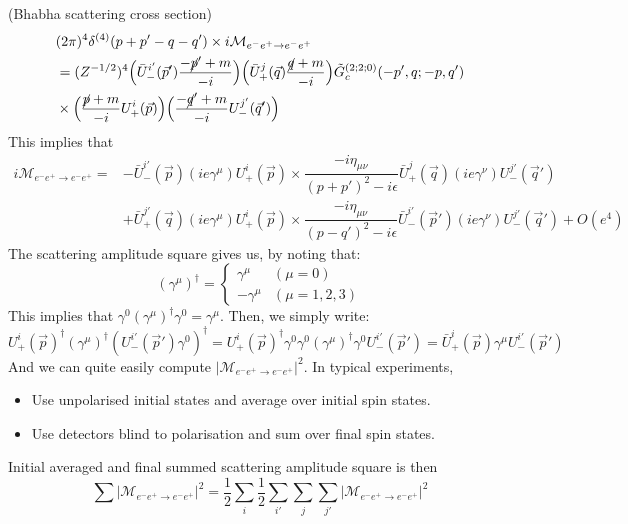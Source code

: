 \begin{ex}
(Bhabha scattering cross section) 
\[\begin{align*}
&(2\pi )^{4}\delta ^{(4)}(p+p'-q-q')\times i\mathcal{M}_{e^{-}e^{+}\rightarrow e^{-}e^{+}}\\
&=(Z^{-1/2})^{4}\Big(\bar{U}^{i'}_{-}(\vec{p}')\dfrac{-\cancel{p}'+m}{-i}\Big)\Big(\bar{U}^{j}_{+}(\vec{q})\dfrac{\cancel{q}+m}{-i}\Big)\tilde{G}_{c}^{(2;2;0)}(-p',q;-p,q')\\
&\times \Big(\dfrac{\cancel{p}+m}{-i}U_{+}^{i}(\vec{p})\Big)\Big(\dfrac{-\cancel{q}'+m}{-i}U_{-}^{j'}(\vec{q}')\Big)
\end{align*}\]
This implies that
\[\begin{align*}
i\mathcal{M}_{e^{-}e^{+}\rightarrow e^{-}e^{+}}=&-\bar{U}^{i'}_{-}(\vec{p})(ie\gamma ^{\mu })U_{+}^{i}(\vec{p})\times \dfrac{-i\eta _{\mu \nu }}{(p+p')^2-i\epsilon }\bar{U}_{+}^{j}(\vec{q})(ie\gamma ^{\nu })U^{j'}_{-}(\vec{q}')\\
&+\bar{U}_{+}^{j'}(\vec{q})(ie\gamma ^{\mu })U_{+}^{i}(\vec{p})\times \dfrac{-i\eta _{\mu \nu }}{(p-q')^2-i\epsilon }\bar{U}_{-}^{i'}(\vec{p}')(ie\gamma ^{\nu })U^{j'}_{-}(\vec{q}')+O(e^{4})
\end{align*}\]
The scattering amplitude square gives us, by noting that:
\[(\gamma ^{\mu })^{\dagger }=\begin{cases}
\gamma ^{\mu }&(\mu =0)\\
-\gamma ^{\mu }&(\mu =1,2,3)
\end{cases}\]
This implies that $\gamma ^{0}(\gamma ^{\mu })^{\dagger }\gamma ^{0}=\gamma ^{\mu }$. Then, we simply write:
\[U_{+}^{i}(\vec{p})^{\dagger }(\gamma ^{\mu })^{\dagger }(U^{i'}_{-}(\vec{p}')\gamma ^{0})^{\dagger }=U_{+}^{i}(\vec{p})^{\dagger }\gamma ^{0}\gamma ^{0}(\gamma ^{\mu } )^{\dagger }\gamma ^{0}U_{-}^{i'}(\vec{p}')=\bar{U}^{i}_{+}(\vec{p})\gamma ^{\mu }U^{i'}_{-}(\vec{p}')\]
And we can quite easily compute $|\mathcal{M}_{e^{-}e^{+}\rightarrow e^{-}e^{+}}|^2$. In typical experiments,
\begin{itemize}
\item[(i)] Use unpolarised initial states and average over initial spin states.
\item[(ii)] Use detectors blind to polarisation and sum over final spin states.
\end{itemize}
Initial averaged and final summed scattering amplitude square is then
\[\sum |\mathcal{M}_{e^{-}e^{+}\rightarrow e^{-}e^{+}}|^2=\dfrac{1}{2}\sum _{i}\dfrac{1}{2}\sum _{i'}\sum _{j}\sum _{j'}|\mathcal{M}_{e^{-}e^{+}\rightarrow e^{-}e^{+}}|^2\]

\end{ex}
